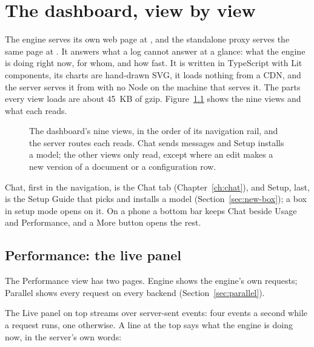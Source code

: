 \chapter{The dashboard, view by view}\label{ch:dashboard}

The engine serves its own web page at , and the standalone proxy serves the same page at . It answers what a log cannot answer at a glance: what the engine is doing right now, for whom, and how fast. It is written in TypeScript with Lit components, its charts are hand-drawn SVG, it loads nothing from a CDN, and the server serves it from  with no Node on the machine that serves it. The parts every view loads are about 45~KB of gzip. Figure~\ref{fig:dashboard-map} shows the nine views and what each reads.

\begin{figure}[htbp]
\centering

\caption[The dashboard's views]{The dashboard's nine views, in the order of its navigation rail, and the server routes each reads. Chat sends messages and Setup installs a model; the other views only read, except where an edit makes a new version of a document or a configuration row.}\label{fig:dashboard-map}
\end{figure}

Chat, first in the navigation, is the Chat tab (Chapter~\ref{ch:chat}), and Setup, last, is the Setup Guide that picks and installs a model (Section~\ref{sec:new-box}); a box in setup mode opens on it. On a phone a bottom bar keeps Chat beside Usage and Performance, and a More button opens the rest.

\section{Performance: the live panel}

The Performance view has two pages. Engine shows the engine's own requests; Parallel shows every request on every backend (Section~\ref{sec:parallel}).


The Live panel on top streams  over server-sent events: four events a second while a request runs, one otherwise. A line at the top says what the engine is doing now, in the server's own words:


